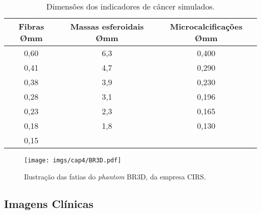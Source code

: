  \begin{table}[htb]
 	\centering
 	\caption{Dimensões dos indicadores de câncer simulados.}
 	\label{tab:tabCap4BR3D}
 	\begin{tabular}{c|c|c}
 		\textbf{Fibras {\O}mm}                                              & \textbf{Massas esferoidais {\O}mm} & \textbf{Microcalcificações {\O}mm} \\
 		[5pt]
 		\hline
 		\hline
 		\rule[0ex]{0pt}{3ex}
 		0,60 							 &             6,3             &            0,400            \\ \hline
 		\rule[0ex]{0pt}{3ex}
 		0,41                             &             4,7             &            0,290            \\ \hline
 		\rule[0ex]{0pt}{3ex}
 		0,38                             &             3,9             &            0,230            \\ \hline
 		\rule[0ex]{0pt}{3ex}
 		0,28                             &             3,1             &            0,196            \\ \hline
 		\rule[0ex]{0pt}{3ex}
 		0,23                             &             2,3             &            0,165            \\ \hline
 		\rule[0ex]{0pt}{3ex}
 		0,18                             &             1,8             &            0,130            \\ \hline
 		\rule[0ex]{0pt}{3ex}
 		0,15                             &                             &            	             \\ \hline
 	\end{tabular}
 	\vspace{2ex}
 \end{table}

\begin{figure}[htb]
	\caption{Ilustração das fatias do \textit{phantom} BR3D, da empresa CIRS.}
	\begin{center}
		\texttt{[image: imgs/cap4/BR3D.pdf]}
	\end{center}
	\label{fig:imgCap4BR3D}
\end{figure} 

\subsection{Imagens Clínicas}

